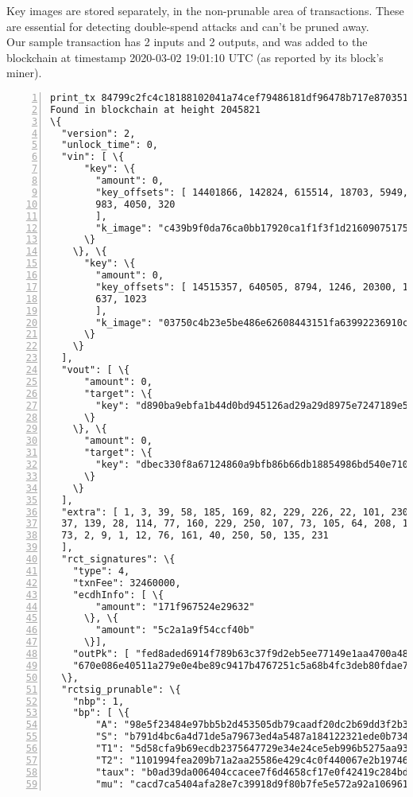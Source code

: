 \begin{appendices}
Key images are stored separately, in the non-prunable area of transactions. These are essential for detecting double-spend attacks and can’t be pruned away.
\\

Our sample transaction has 2 inputs and 2 outputs, and was added to the blockchain at timestamp 2020-03-02 19:01:10 UTC (as reported by its block's miner).

\begin{Verbatim}[commandchars=\\\{\}, numbers=left]
print_tx 84799c2fc4c18188102041a74cef79486181df96478b717e8703512c7f7f3349
Found in blockchain at height 2045821
\{
  "version": 2, 
  "unlock_time": 0, 
  "vin": [ \{
      "key": \{
        "amount": 0, 
        "key_offsets": [ 14401866, 142824, 615514, 18703, 5949, 22840, 5572, 16439,
        983, 4050, 320
        ], 
        "k_image": "c439b9f0da76ca0bb17920ca1f1f3f1d216090751752b091bef9006918cb3db4"
      \}
    \}, \{
      "key": \{
        "amount": 0, 
        "key_offsets": [ 14515357, 640505, 8794, 1246, 20300, 18577, 17108, 9824, 581,
        637, 1023
        ], 
        "k_image": "03750c4b23e5be486e62608443151fa63992236910c41fa0c4a0a938bc6f5a37"
      \}
    \}
  ], 
  "vout": [ \{
      "amount": 0, 
      "target": \{
        "key": "d890ba9ebfa1b44d0bd945126ad29a29d8975e7247189e5076c19fa7e3a8cb00"
      \}
    \}, \{
      "amount": 0, 
      "target": \{
        "key": "dbec330f8a67124860a9bfb86b66db18854986bd540e710365ad6079c8a1c7b0"
      \}
    \}
  ], 
  "extra": [ 1, 3, 39, 58, 185, 169, 82, 229, 226, 22, 101, 230, 254, 20, 143,
  37, 139, 28, 114, 77, 160, 229, 250, 107, 73, 105, 64, 208, 154, 182, 158, 200,
  73, 2, 9, 1, 12, 76, 161, 40, 250, 50, 135, 231
  ], 
  "rct_signatures": \{
    "type": 4, 
    "txnFee": 32460000, 
    "ecdhInfo": [ \{
        "amount": "171f967524e29632"
      \}, \{
        "amount": "5c2a1a9f54ccf40b"
      \}], 
    "outPk": [ "fed8aded6914f789b63c37f9d2eb5ee77149e1aa4700a482aea53f82177b3b41",
    "670e086e40511a279e0e4be89c9417b4767251c5a68b4fc3deb80fdae7269c17"]
  \}, 
  "rctsig_prunable": \{
    "nbp": 1, 
    "bp": [ \{
        "A": "98e5f23484e97bb5b2d453505db79caadf20dc2b69dd3f2b3dbf2a53ca280216", 
        "S": "b791d4bc6a4d71de5a79673ed4a5487a184122321ede0b7341bc3fdc0915a796", 
        "T1": "5d58cfa9b69ecdb2375647729e34e24ce5eb996b5275aa93f9871259f3a1aecd", 
        "T2": "1101994fea209b71a2aa25586e429c4c0f440067e2b197469aa1a9a1512f84b7", 
        "taux": "b0ad39da006404ccacee7f6d4658cf17e0f42419c284bdca03c0250303706c03", 
        "mu": "cacd7ca5404afa28e7c39918d9f80b7fe5e572a92a10696186d029b4923fa200", 

\end{Verbatim}
\end{appendices}
